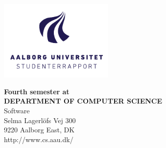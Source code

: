 

{}
\thispagestyle{empty}

\begin{minipage}[t]{0.48\textwidth}
\vspace*{-25pt}			%
\includegraphics[height=4cm]{billeder/AAU-logo-stud-DK-RGB}
\end{minipage}
\hfill
\begin{minipage}[t]{0.48\textwidth}
{\small 
\textbf{Fourth semester at}\\
\textbf{DEPARTMENT OF COMPUTER SCIENCE}  \\
Software \\
Selma Lagerlöfs Vej 300 \\
9220 Aalborg East, DK \\
http://www.cs.aau.dk/}
\end{minipage}

\vspace*{1cm}

